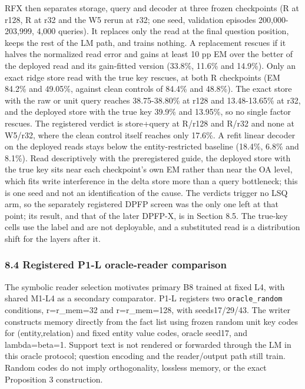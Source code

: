 RFX then separates storage, query and decoder at three frozen checkpoints (R at r128, R at r32
and the W5 rerun at r32; one seed, validation episodes 200,000-203,999, 4,000 queries). It
replaces only the read at the final question position, keeps the rest of the LM path, and trains
nothing. A replacement rescues if it halves the normalized read error and gains at least 10 pp
EM over the better of the deployed read and its gain-fitted version (33.8\%, 11.6\% and 14.9\%).
 Only an exact ridge store read with the true key rescues, at both R checkpoints (EM  %
84.2\% and 49.05\%, against clean controls of 84.4\% and 48.8\%). The exact store with the raw or
unit query reaches 38.75-38.80\% at r128 and 13.48-13.65\% at r32, and the deployed store with
the true key 39.9\% and 13.95\%, so no single factor rescues. The  %
registered verdict is store+query at R/\allowbreak{}r128 and R/\allowbreak{}r32 and none at W5/\allowbreak{}r32, where the clean
control itself reaches only 17.6\%. A refit linear decoder on the deployed reads  %
stays below the entity-restricted baseline (18.4\%, 6.8\% and 8.1\%). Read  %
descriptively with the preregistered guide, the deployed store with the true key sits near each
checkpoint’s own EM rather than near the OA level, which fits write interference in the delta
store more than a query bottleneck; this is one seed and not an identification of the cause.
 The verdicts trigger no LSQ arm, so the separately registered DPFP screen was the only  %
one left at that point; its result, and that of the later DPFP-X, is in Section 8.5. The true-key cells use the label and  %
are not deployable, and a substituted read is a distribution shift for the layers after it.

\subsubsection*{8.4 Registered P1-L oracle-reader comparison}

The symbolic reader selection motivates primary B8 trained at fixed L4, with
shared M1-L4 as a secondary comparator. P1-L registers two  %
\texttt{oracle\_random} conditions, r=r\_mem=32 and r=r\_mem=128, with seeds17/\allowbreak{}29/\allowbreak{}43.  %
The writer constructs memory directly from the fact list using frozen random
unit key codes for (entity,relation) and fixed entity value codes, oracle seed17,
and lambda=beta=1. Support text is not rendered or forwarded through  %
the LM in this oracle protocol; question encoding and the reader/\allowbreak{}output path
still train. Random codes do not imply orthogonality, lossless memory,  %
or the exact Proposition 3 construction.  %

